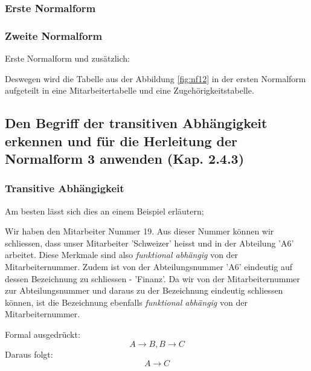 \subsubsection{Erste Normalform}
\begin{center}
\end{center}

\subsubsection{Zweite Normalform}
Erste Normalform und zusätzlich:
\begin{center}
\end{center}


Deswegen wird die Tabelle aus der Abbildung \ref{fig:nf12} in der ersten Normalform aufgeteilt in eine Mitarbeitertabelle und eine Zugehörigkeitstabelle.

\subsection{Den Begriff der transitiven Abhängigkeit erkennen und für die Herleitung der Normalform 3 anwenden (Kap. 2.4.3)}
\subsubsection{Transitive Abhängigkeit}
Am besten lässt sich dies an einem Beispiel erläutern;

Wir haben den Mitarbeiter Nummer 19. Aus dieser Nummer können wir schliessen, dass unser Mitarbeiter 'Schweizer' heisst und in der Abteilung 'A6' arbeitet. Diese Merkmale sind also \emph{funktional abhängig} von der Mitarbeiternummer. Zudem ist von der Abteilungsnummer 'A6' eindeutig auf dessen Bezeichnung zu schliessen - 'Finanz'. Da wir von der Mitarbeiternummer zur Abteilungsnummer und daraus zu der Bezeichnung eindeutig schliessen können, ist die Bezeichnung ebenfalls \emph{funktional abhängig} von der Mitarbeiternummer.

Formal ausgedrückt:
\begin{equation*}
    A\rightarrow B , B\rightarrow C
\end{equation*}
Daraus folgt:
\begin{equation*}
    A\rightarrow C
\end{equation*}

